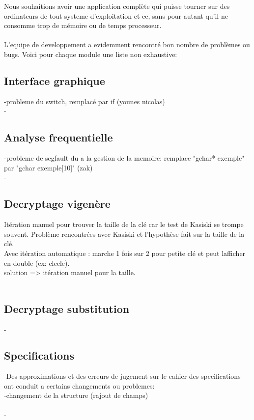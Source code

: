 \documentclass[a4]{article}
\begin{document}
	
	Nous souhaitions avoir une application complète qui puisse tourner sur des ordinateurs 
de tout systeme d'exploitation et ce, sans pour autant qu’il ne
consomme trop de mémoire ou de temps processeur. \\ \\
	
	L'equipe de developpement a evidemment rencontré bon nombre de problèmes ou bugs. Voici pour chaque
	module une liste non exhaustive:
	\subsection{Interface graphique}
	-probleme du switch, remplacé par if (younes nicolas)\\
	-
	\subsection{Analyse frequentielle}
	-probleme de segfault du a la gestion de la memoire: remplace "gchar* exemple" par "gchar exemple[10]" (zak) \\
	-
	\subsection{Decryptage vigenère}
 		Itération manuel pour trouver la taille de la clé car le test de Kasiski se trompe souvent. 
 		Problème rencontrées avec Kasiski et l'hypothèse fait sur la taille de la clé. \\
 		Avec itération automatique : marche 1 fois sur 2 pour petite clé et peut lafficher en double (ex: clecle). \\
		solution => itération manuel pour la taille. \\ \\
	
	\subsection{Decryptage substitution}
	-\\
	
		
		\subsection{Specifications}
		-Des approximations et des erreurs de jugement sur le cahier des specifications ont conduit a certains changements ou problemes:\\
		-changement de la structure (rajout de champs)\\
		-\\
		-\\ \\
		
\end{document}
